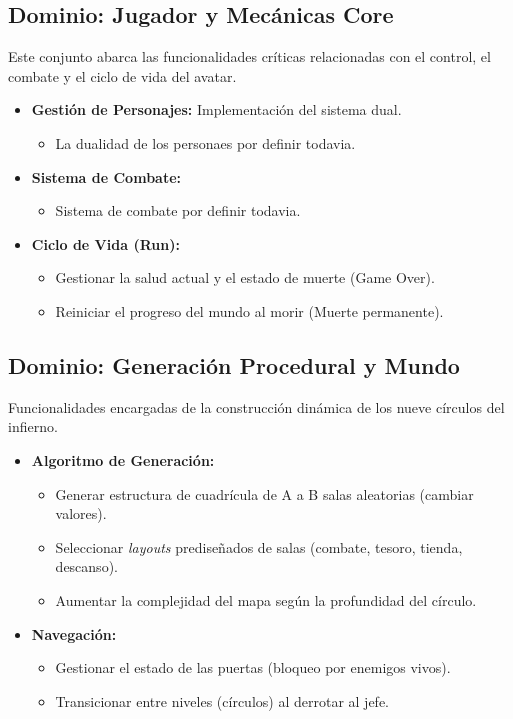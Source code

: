 \subsection{Dominio: Jugador y Mecánicas Core}
Este conjunto abarca las funcionalidades críticas relacionadas con el control, 
el combate y el ciclo de vida del avatar.
\begin{itemize}
    \item \textbf{Gestión de Personajes:} Implementación del sistema dual.
    \begin{itemize}
        \item La dualidad de los personaes por definir todavia.
    \end{itemize}
    \item \textbf{Sistema de Combate:}
    \begin{itemize}
        \item Sistema de combate por definir todavia.
    \end{itemize}
    \item \textbf{Ciclo de Vida (Run):}
    \begin{itemize}
        \item Gestionar la salud actual y el estado de muerte (Game Over).
        \item Reiniciar el progreso del mundo al morir (Muerte permanente).
    \end{itemize}
\end{itemize}

\subsection{Dominio: Generación Procedural y Mundo}
Funcionalidades encargadas de la construcción dinámica de los nueve círculos del infierno.
\begin{itemize}
    \item \textbf{Algoritmo de Generación:}
    \begin{itemize}
        \item Generar estructura de cuadrícula de A a B salas aleatorias (cambiar valores).
        \item Seleccionar \textit{layouts} prediseñados de salas (combate, tesoro, tienda, 
        descanso).
        \item Aumentar la complejidad del mapa según la profundidad del círculo.
    \end{itemize}
    \item \textbf{Navegación:}
    \begin{itemize}
        \item Gestionar el estado de las puertas (bloqueo por enemigos vivos).
        \item Transicionar entre niveles (círculos) al derrotar al jefe.
    \end{itemize}
\end{itemize}

